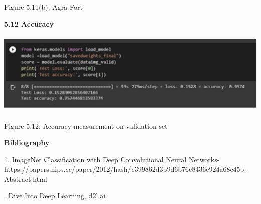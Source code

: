 \documentclass[10pt]{article} %
\begin{document}
\noindent Figure 5.11(b): Agra Fort

\newpage

\noindent \textbf{5.12 Accuracy}

\noindent \textbf{}

\noindent \textbf{\includegraphics*[width=5.75in, height=1.57in, keepaspectratio=false]{image24}}

\noindent 

\noindent Figure 5.12: Accuracy measurement on validation set

\newpage
\noindent \begin{center}
    \textbf{\Large Bibliography}
\end{center} 

\noindent \textbf{}

\noindent 
{1. ImageNet Classification with Deep Convolutional Neural Networks- \newline https://papers.nips.cc/paper/2012/hash/c399862d3b9d6b76c8436e924a68c45b-Abstract.html} \newline

. Dive Into Deep Learning, d2l.ai
\end{document}
